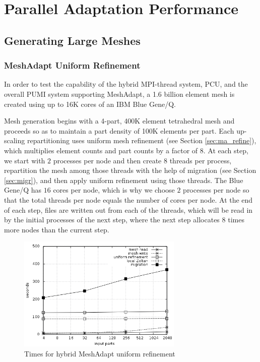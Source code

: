 \section{Parallel Adaptation Performance}

\subsection{Generating Large Meshes}
\label{sec:big_gen}

\subsubsection{MeshAdapt Uniform Refinement}
\label{sec:ma_scale}

In order to test the capability of the hybrid MPI-thread system, PCU,
and the overall PUMI system supporting MeshAdapt,
a 1.6 billion element mesh is created using up to 16K cores of an
IBM Blue Gene/Q.

Mesh generation begins with a 4-part, 400K element tetrahedral
mesh and proceeds so as to maintain a part density of 100K elements
per part.
Each up-scaling repartitioning uses uniform mesh refinement
(see Section \ref{sec:ma_refine}), which
multiplies element counts and part counts by a factor of $8$.
At each step, we start with $2$ processes per node
and then create $8$ threads per process, repartition the mesh
among those threads with the help of migration (see Section \ref{sec:migr}),
and then apply uniform refinement using those threads.
The Blue Gene/Q has $16$ cores per node, which is why we choose $2$
processes per node so that the total threads per node equals the
number of cores per node.
At the end of each step, files are written out from each of the
threads, which will be read in by the initial processes of the
next step, where the next step allocates $8$ times more nodes
than the current step.

\begin{figure}[!ht]
\begin{center}
\includegraphics[width=0.7\textwidth]{pcu_scaling.png}
\caption{Times for hybrid MeshAdapt uniform refinement}
\label{fig:pcu_scale}
\end{center}
\end{figure}

